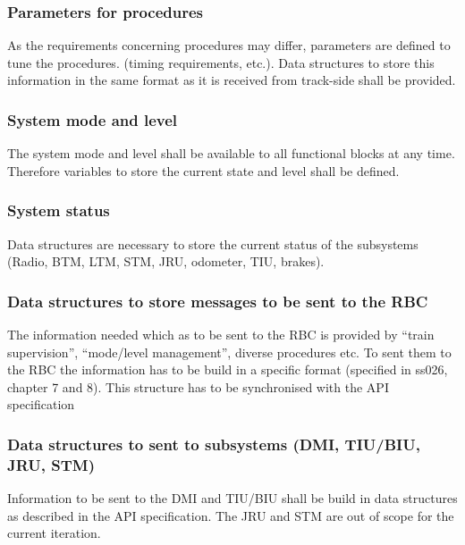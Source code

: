 \subsubsection{Parameters for procedures}
As the requirements concerning procedures may differ, parameters are defined to tune the procedures. (timing requirements, etc.). Data structures to store this information in the same format as it is received from track-side shall be provided.


\subsubsection{System mode and level}
The system mode and level shall be available to all functional blocks at any time. Therefore variables to store the current state and level shall be defined.


\subsubsection{System status}
Data structures are necessary to store the current status of the subsystems (Radio, BTM, LTM, STM, JRU, odometer, TIU, brakes). 


\subsubsection{Data structures to store messages to be sent to the RBC}
The information needed which as to be sent to the RBC is provided by “train supervision”, “mode/level management”, diverse procedures etc. 
To sent them to the RBC the information has to be build in a specific format (specified in ss026, chapter 7 and 8). This structure has to be synchronised with the API specification


\subsubsection{Data structures to sent to subsystems (DMI, TIU/BIU, JRU, STM)}
Information to be sent to the DMI and TIU/BIU shall be build in data structures as described in the API specification.
The JRU and STM are out of scope for the current iteration.

